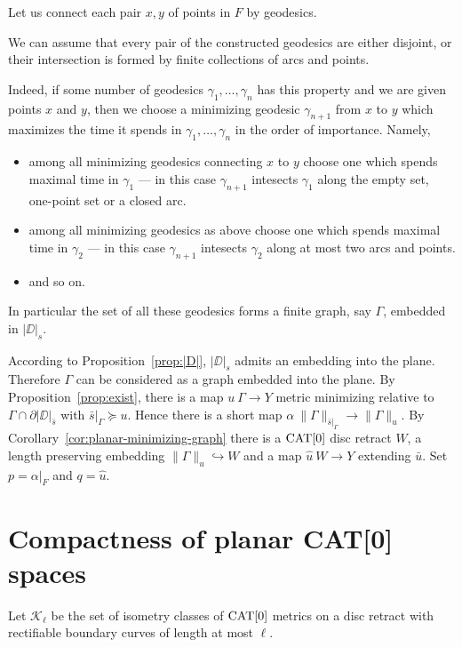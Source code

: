 \documentclass{article}
\begin{document}
Let us connect each pair $x,y$ of points in $F$ by geodesics.

We can assume that 
every pair of the constructed geodesics 
are either disjoint, or their intersection is formed by finite collections of arcs and points.

Indeed, if some number of geodesics $\gamma_1,\dots,\gamma_n$ has this property and we are given points $x$ and $y$, then
we choose a minimizing geodesic $\gamma_{n+1}$ from $x$ to $y$ which maximizes the time it spends in $\gamma_1,\dots,\gamma_n$  in the order of importance.
Namely, 
\begin{itemize}
\item  among all minimizing geodesics connecting $x$ to $y$
choose one which spends maximal time in $\gamma_1$ --- in this case $\gamma_{n+1}$ intesects $\gamma_1$ along the empty set, one-point set or a closed arc.
\item among all minimizing geodesics as above
choose one which spends maximal time in $\gamma_2$ --- in this case $\gamma_{n+1}$ intesects $\gamma_2$ along at most two arcs and points.
\item and so on.
\end{itemize}


In particular the set of all these geodesics forms a finite graph, say $\Gamma$,
embedded in $|\DD|_s$. 

According to Proposition~\ref{prop:|D|},
$|\DD|_s$ admits an embedding into the plane.
Therefore $\Gamma$ can be considered as a graph embedded into the plane.
By Proposition~\ref{prop:exist}, there is a map $u\:\Gamma\to Y$ metric minimizing relative to $\Gamma\cap\partial|\DD|_{\bar s}$ with
$\bar s|_\Gamma\succcurlyeq u$.
Hence there is a short map $\alpha\:\|\Gamma\|_{\bar s|_\Gamma}\to\|\Gamma\|_u$. 
By Corollary~\ref{cor:planar-minimizing-graph} there is a $\mathop{\rm CAT}\nolimits[0]$ disc retract $W$, a length preserving embedding
$\|\Gamma\|_u\hookrightarrow W$ and a map $\hat u\:W\to Y$ extending $\bar u$. %
Set $p=\alpha|_F$ and $q=\hat u$.
\qeds

\section{Compactness of planar CAT[0] spaces}\label{Compactness}

Let $\mathcal{K}_\ell$ be the set of isometry classes of $\mathop{\rm CAT}\nolimits[0]$ metrics on a disc retract with rectifiable
boundary curves of length at most $\ell$.
\end{document}
